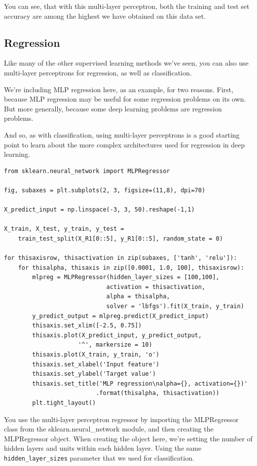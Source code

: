 \begin{multicols}{2}
You can see, that with this multi-layer perceptron, both the training and test set accuracy are among the highest we have obtained on this data set. 

\subsection{Regression}

Like many of the other supervised learning methods we've seen, you can also use multi-layer perceptrons for regression, as well as classification. 

We're including MLP regression here, as an example, for two reasons. First, because MLP regression may be useful for some regression problems on its own. But more generally, because some deep learning problems are regression problems. 

And so, as with classification, using multi-layer perceptrons is a good starting point to learn about the more complex architectures used for regression in deep learning. 

{\tiny
\begin{verbatim}
from sklearn.neural_network import MLPRegressor

fig, subaxes = plt.subplots(2, 3, figsize=(11,8), dpi=70)

X_predict_input = np.linspace(-3, 3, 50).reshape(-1,1)

X_train, X_test, y_train, y_test = 
    train_test_split(X_R1[0::5], y_R1[0::5], random_state = 0)

for thisaxisrow, thisactivation in zip(subaxes, ['tanh', 'relu']):
    for thisalpha, thisaxis in zip([0.0001, 1.0, 100], thisaxisrow):
        mlpreg = MLPRegressor(hidden_layer_sizes = [100,100],
                             activation = thisactivation,
                             alpha = thisalpha,
                             solver = 'lbfgs').fit(X_train, y_train)
        y_predict_output = mlpreg.predict(X_predict_input)
        thisaxis.set_xlim([-2.5, 0.75])
        thisaxis.plot(X_predict_input, y_predict_output,
                     '^', markersize = 10)
        thisaxis.plot(X_train, y_train, 'o')
        thisaxis.set_xlabel('Input feature')
        thisaxis.set_ylabel('Target value')
        thisaxis.set_title('MLP regression\nalpha={}, activation={})'
                          .format(thisalpha, thisactivation))
        plt.tight_layout()
\end{verbatim}
}        
        
You use the multi-layer perceptron regressor by importing the MLPRegressor class from the sklearn.neural_network module, and then creating the MLPRegressor object. When creating the object here, we're setting the number of hidden layers and units within each hidden layer. Using the same \texttt{hidden_layer_sizes} parameter that we used for classification. 


\end{multicols}
